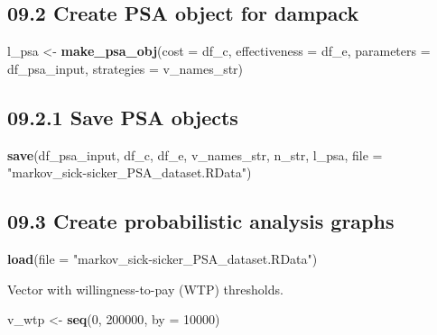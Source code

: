 \documentclass[]{article}
\newenvironment{Shaded}{\begin{snugshade}}{\end{snugshade}}
\newcommand{\KeywordTok}[1]{\textcolor[rgb]{0.13,0.29,0.53}{\textbf{#1}}}
\newcommand{\DataTypeTok}[1]{\textcolor[rgb]{0.13,0.29,0.53}{#1}}
\newcommand{\DecValTok}[1]{\textcolor[rgb]{0.00,0.00,0.81}{#1}}
\newcommand{\StringTok}[1]{\textcolor[rgb]{0.31,0.60,0.02}{#1}}
\newcommand{\NormalTok}[1]{#1}
\begin{document}
\subsection{09.2 Create PSA object for
dampack}\label{create-psa-object-for-dampack}

\begin{Shaded}
\begin{Highlighting}[]
\NormalTok{l_psa <-}\StringTok{ }\KeywordTok{make_psa_obj}\NormalTok{(}\DataTypeTok{cost          =}\NormalTok{ df_c, }
                      \DataTypeTok{effectiveness =}\NormalTok{ df_e, }
                      \DataTypeTok{parameters    =}\NormalTok{ df_psa_input, }
                      \DataTypeTok{strategies    =}\NormalTok{ v_names_str)}
\end{Highlighting}
\end{Shaded}

\subsection{09.2.1 Save PSA objects}\label{save-psa-objects}

\begin{Shaded}
\begin{Highlighting}[]
\KeywordTok{save}\NormalTok{(df_psa_input, df_c, df_e, v_names_str, n_str, l_psa,}
     \DataTypeTok{file =} \StringTok{"markov_sick-sicker_PSA_dataset.RData"}\NormalTok{)}
\end{Highlighting}
\end{Shaded}

\subsection{09.3 Create probabilistic analysis
graphs}\label{create-probabilistic-analysis-graphs}

\begin{Shaded}
\begin{Highlighting}[]
\KeywordTok{load}\NormalTok{(}\DataTypeTok{file =} \StringTok{"markov_sick-sicker_PSA_dataset.RData"}\NormalTok{)}
\end{Highlighting}
\end{Shaded}

Vector with willingness-to-pay (WTP) thresholds.

\begin{Shaded}
\begin{Highlighting}[]
\NormalTok{v_wtp <-}\StringTok{ }\KeywordTok{seq}\NormalTok{(}\DecValTok{0}\NormalTok{, }\DecValTok{200000}\NormalTok{, }\DataTypeTok{by =} \DecValTok{10000}\NormalTok{)}
\end{Highlighting}
\end{Shaded}
\end{document}
